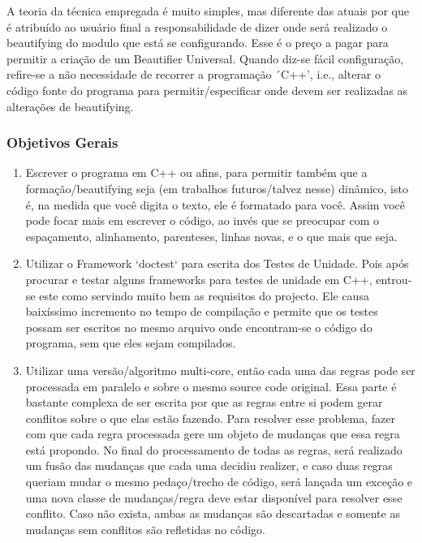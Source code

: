     A teoria da técnica empregada é muito simples, mas diferente das atuais por que é atribuído ao
    usuário final a responsabilidade de dizer onde será realizado o beautifying do modulo que está
    se configurando. Esse é o preço a pagar para permitir a criação de um Beautifier Universal.
    Quando diz-se fácil configuração, refire-se a não necessidade de recorrer a programação ´C++',
    i.e., alterar o código fonte do programa para permitir/especificar onde devem ser realizadas as
    alterações de beautifying.


\subsubsection{Objetivos Gerais}

    \begin{enumerate}[leftmargin=*]

        \item

        Escrever o programa em C++ ou afins, para permitir também que a formação/beautifying seja
        (em trabalhos futuros/talvez nesse) dinâmico, isto é, na medida que você digita o texto, ele
        é formatado para você. Assim você pode focar mais em escrever o código, ao invés que se
        preocupar com o espaçamento, alinhamento, parenteses, linhas novas, e o que mais que seja.

        \item

        Utilizar o Framework `doctest` para escrita dos Testes de Unidade. Pois após procurar e
        testar alguns frameworks para testes de unidade em C++, entrou-se este como servindo muito
        bem as requisitos do projecto. Ele causa baixíssimo incremento no tempo de compilação e
        permite que os testes possam ser escritos no mesmo arquivo onde encontram-se o código do
        programa, sem que eles sejam compilados.

        \item

        Utilizar uma versão/algoritmo multi-core, então cada uma das regras pode ser processada em
        paralelo e sobre o mesmo source code original. Essa parte é bastante complexa de ser escrita
        por que as regras entre si podem gerar conflitos sobre o que elas estão fazendo. Para
        resolver esse problema, fazer com que cada regra processada gere um objeto de mudanças que
        essa regra está propondo. No final do processamento de todas as regras, será realizado um
        fusão das mudanças que cada uma decidiu realizer, e caso duas regras queriam mudar o mesmo
        pedaço/trecho de código, será lançada um exceção e uma nova classe de mudanças/regra deve
        estar disponível para resolver esse conflito. Caso não exista, ambas as mudanças são
        descartadas e somente as mudanças sem conflitos são refletidas no código.

    \end{enumerate}


